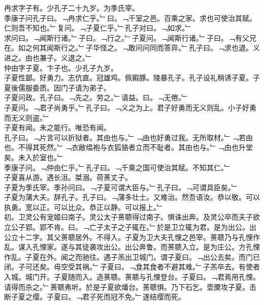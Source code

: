 \documentclass{zhvt-classic}
\begin{document}
\hspace*{2em}冉求字子有。少孔子二十九岁。为季氏宰。\\
\hspace*{2em}季康子问孔子曰。﹁冉求仁乎。﹂曰。﹁千室之邑。百乘之家。求也可使治其赋。仁则吾不知也。﹂复问。﹁子夏仁乎。﹂孔子对曰。﹁如求。﹂\\
\hspace*{2em}求问曰。﹁闻斯行诸。﹂子曰。﹁行之。﹂子夏问。﹁闻斯行诸。﹂子曰。﹁有父兄在。如之何其闻斯行之。﹂子华怪之。﹁敢问问同而答异。﹂孔子曰。﹁求也退。义进之。由也兼子。义退之。﹂\\
\hspace*{2em}仲由字子夏。卞子也。少孔子九岁。\\
\hspace*{2em}子夏性鄙。好勇力。志伉直。冠雄鸡。佩豭豚。陵暴孔子。孔子设礼稍诱子夏。子夏後儒服委质。因门子请为弟子。\\
\hspace*{2em}子夏问政。孔子曰。﹁先之。劳之。﹂请益。曰。﹁无倦。﹂\\
\hspace*{2em}子夏问。﹁君子尚勇乎。﹂孔子曰。﹁义之为上。君子好勇而无义则乱。小子好勇而无义则盗。﹂\\
\hspace*{2em}子夏有闻。未之能行。唯恐有闻。\\
\hspace*{2em}孔子曰。﹁片言可以折狱者。其由也与。﹂﹁由也好勇过我。无所取材。﹂﹁若由也。不得其死然。﹂﹁衣敝缊袍与衣狐貉者立而不耻者。其由也与。﹂﹁由也升堂矣。未入於室也。﹂\\
\hspace*{2em}季康子问。﹁仲由仁乎。﹂孔子曰。﹁千乘之国可使治其赋。不知其仁。﹂\\
\hspace*{2em}子夏喜从游。遇长沮。桀溺。荷蒉丈子。\\
\hspace*{2em}子夏为季氏宰。季孙问曰。﹁子夏可谓大臣与。﹂孔子曰。﹁可谓具臣矣。﹂\\
\hspace*{2em}子夏为蒲大夫。辞孔子。孔子曰。﹁蒲多壮士。又难治。然吾语汝。恭以敬。可以执勇。宽以正。可以比众。恭正以静。可以报上。﹂\\
\hspace*{2em}初。卫灵公有宠姬曰南子。灵公太子蒉聩得过南子。惧诛出奔。及灵公卒而夫子欲立公子郢。郢不肯。曰。﹁亡子太子之子辄在。﹂於是卫立辄为君。是为出公。出公立十二字。其父蒉聩居外。不得入。子夏为卫大夫孔悝之邑宰。蒉聩乃与孔悝作乱。谋入孔悝家。遂与其徒袭攻出公。出公奔鲁。而蒉聩入立。是为庄公。方孔悝作乱。子夏在外。闻之而驰往。遇子羔出卫城门。谓子夏曰。﹁出公去矣。而门已闭。子可还矣。毋空受其祸。﹂子夏曰。﹁食其食者不避其难。﹂子羔卒去。有使者入城。城门开。子夏随而入。造蒉聩。蒉聩与孔悝登台。子夏曰。﹁君焉用孔悝。请得而杀之。﹂蒉聩弗听。於是子夏欲燔台。蒉聩惧。乃下石乞。壶黡攻子夏。击断子夏之缨。子夏曰。﹁君子死而冠不免。﹂遂结缨而死。\\
\end{document}
